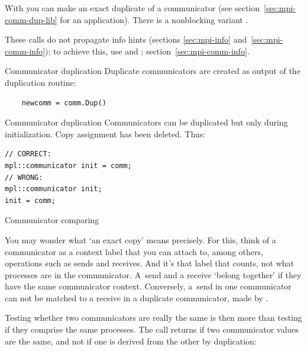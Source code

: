 
With 
you can make an exact duplicate of a communicator
(see section~\ref{sec:mpi-comm-dup-lib} for an application).
There is a nonblocking variant .

These calls do not propagate info hints
(sections \ref{sec:mpi-info} and~\ref{sec:mpi-comm-info});
to achieve this,
use  and ;
section~\ref{sec:mpi-comm-info}.

\begin{pythonnote}{Communicator duplication}
  Duplicate communicators are created as output of the duplication routine:
  \begin{lstlisting}
    newcomm = comm.Dup()
  \end{lstlisting}
\end{pythonnote}

\begin{mplnote}{Communicator duplication}
  Communicators can be duplicated but only during initialization.
  Copy assignment has been deleted. Thus:
\begin{lstlisting}
// CORRECT: 
mpl::communicator init = comm;
// WRONG:
mpl::communicator init;
init = comm;
\end{lstlisting}
\end{mplnote}

 {Communicator comparing}
\label{sec:comm-compare}

You may wonder what `an exact copy' means precisely.
For this, think of a communicator as a context label that you can attach to,
among others, operations such as sends and receives.
And it's that label that counts, not what processes are in the communicator.
A~send and a receive `belong together' if they have the same communicator context.
Conversely, a~send in one communicator can not be matched
to a receive in a duplicate communicator, made by .

Testing whether two communicators are really the same
is then more than testing if they comprise the same processes.
The call  returns 
if two communicator values are the same,
and not if one is derived from the other by duplication:
%

